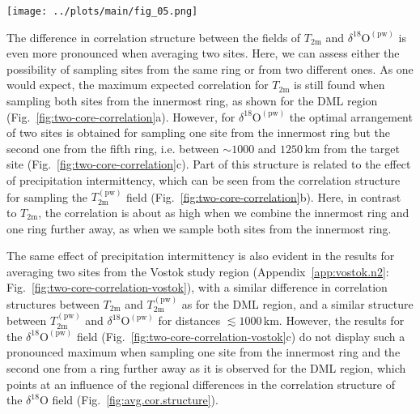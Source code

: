 \documentclass[cp, manuscript]{copernicus}
\begin{document}
\begin{figure*}[t]%
\centering
\texttt{[image: ../plots/main/fig\_05.png]}
\caption{%
  The expected correlation with the target site temperature for the average of
  two sites in the DML region. Shown is the mean correlation of all possible
  single correlations from averaging two grid cells of (\textbf{a})
  $T_{\mathrm{2m}}$, (\textbf{b}) $T_{\mathrm{2m}}^{\mathrm{(pw)}}$ and
  (\textbf{c}) $\delta^{18}\mathrm{O}^{\mathrm{(pw)}}$ time series sampled from
  the same or from two different rings, averaged over all target sites in
  the given region. The axes display the distance from the target, where the $x$
  ($y$) axis stands for the first (second) sampled ring and tickmarks
  indicate the radius of the midpoints of the rings.}
\label{fig:two-core-correlation}%
\end{figure*}%

The difference in correlation structure between the fields of $T_{\mathrm{2m}}$
and $\delta^{18}\mathrm{O}^{\mathrm{(pw)}}$ is even more pronounced when
averaging two sites. Here, we can assess either the possibility of sampling
sites from the same ring or from two different ones. As one would expect, the
maximum expected correlation for $T_{\mathrm{2m}}$ is still found when sampling
both sites from the innermost ring, as shown for the DML region
(Fig.~\ref{fig:two-core-correlation}a). However, for
$\delta^{18}\mathrm{O}^{\mathrm{(pw)}}$ the optimal arrangement of two sites is
obtained for sampling one site from the innermost ring but the second one from
the fifth ring, i.e. between $\sim1000$ and $1250$\,km from the target site
(Fig.~\ref{fig:two-core-correlation}c). Part of this structure is related to the
effect of precipitation intermittency, which can be seen from the correlation
structure for sampling the $T_{\mathrm{2m}}^{\mathrm{(pw)}}$ field
(Fig.~\ref{fig:two-core-correlation}b). Here, in contrast to $T_{\mathrm{2m}}$,
the correlation is about as high when we combine the innermost ring and one ring
further away, as when we sample both sites from the innermost ring.

The same effect of precipitation intermittency is also evident in the results
for averaging two sites from the Vostok study region
(Appendix~\ref{app:vostok.n2}: Fig.~\ref{fig:two-core-correlation-vostok}), with
a similar difference in correlation structures between $T_{\mathrm{2m}}$ and
$T_{\mathrm{2m}}^{\mathrm{(pw)}}$ as for the DML region, and a similar structure
between $T_{\mathrm{2m}}^{\mathrm{(pw)}}$ and
$\delta^{18}\mathrm{O}^{\mathrm{(pw)}}$ for distances $\lesssim1000$\,km.
However, the results for the $\delta^{18}\mathrm{O}^{\mathrm{(pw)}}$ field
(Fig.~\ref{fig:two-core-correlation-vostok}c) do not display such a pronounced
maximum when sampling one site from the innermost ring and the second one from a
ring further away as it is observed for the DML region, which points at an
influence of the regional differences in the correlation structure of the
$\delta^{18}\mathrm{O}$ field (Fig.~\ref{fig:avg.cor.structure}).
\end{document}
